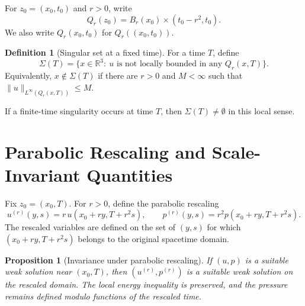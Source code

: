 \documentclass[11pt]{amsart}
\theoremstyle{plain}
\newtheorem{proposition}[proposition]{Proposition}
\theoremstyle{definition}
\newtheorem{definition}[definition]{Definition}
\theoremstyle{remark}
\begin{document}
For \(z_0=(x_0,t_0)\) and \(r>0\), write
\[
  Q_r(z_0)=B_r(x_0)\times(t_0-r^2,t_0).
\]
We also write \(Q_r(x_0,t_0)\) for \(Q_r((x_0,t_0))\).

\begin{definition}[Singular set at a fixed time]
For a time \(T\), define
\[
  \Sigma(T)=
  \{x\in\mathbb R^3:\ u\text{ is not locally bounded in any }
  Q_r(x,T)\}.
\]
Equivalently, \(x\notin\Sigma(T)\) if there are \(r>0\) and \(M<\infty\) such
that \(\|u\|_{L^\infty(Q_r(x,T))}\le M\).
\end{definition}

If a finite-time singularity occurs at time \(T\), then
\(\Sigma(T)\ne\emptyset\) in this local sense.

\section{Parabolic Rescaling and Scale-Invariant Quantities}

Fix \(z_0=(x_0,T)\).  For \(r>0\), define the parabolic rescaling
\[
  u^{(r)}(y,s)=r\,u(x_0+ry,T+r^2s),
  \qquad
  p^{(r)}(y,s)=r^2p(x_0+ry,T+r^2s).
\]
The rescaled variables are defined on the set of \((y,s)\) for which
\((x_0+ry,T+r^2s)\) belongs to the original spacetime domain.

\begin{proposition}[Invariance under parabolic rescaling]
If \((u,p)\) is a suitable weak solution near \((x_0,T)\), then
\((u^{(r)},p^{(r)})\) is a suitable weak solution on the rescaled domain.  The
local energy inequality is preserved, and the pressure remains defined modulo
functions of the rescaled time.
\end{proposition}
\end{document}
